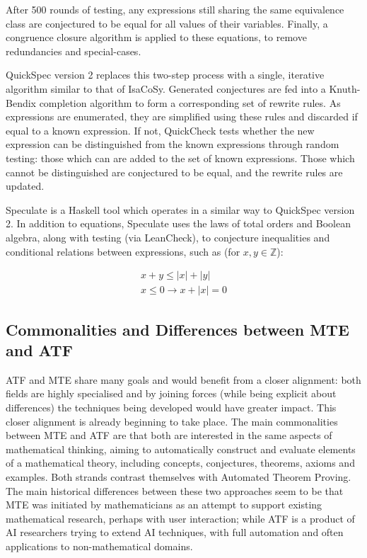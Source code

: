 After 500 rounds of testing, any expressions still sharing the same equivalence
class are conjectured to be equal for all values of their variables. Finally, a
congruence closure algorithm is applied to these equations, to remove
redundancies and special-cases.

QuickSpec version 2 replaces this two-step process with a single, iterative
algorithm similar to that of IsaCoSy. Generated conjectures are fed into a
Knuth-Bendix completion algorithm to form a corresponding set of rewrite rules.
As expressions are enumerated, they are simplified using these rules and
discarded if equal to a known expression. If not, QuickCheck tests whether the
new expression can be distinguished from the known expressions through random
testing: those which can are added to the set of known expressions. Those which
cannot be distinguished are conjectured to be equal, and the rewrite rules are
updated.

Speculate is a Haskell tool which operates in a similar way to QuickSpec
version 2. In addition to equations, Speculate uses the laws of total orders and
Boolean algebra, along with testing (via LeanCheck), to conjecture inequalities
and conditional relations between expressions, such as (for
$x, y \in \mathbb{Z}$):

\begin{equation*}
  \begin{aligned}
    x + y \leq \lvert x \rvert + \lvert y \rvert \\
    x \leq 0 \rightarrow x + \lvert x \rvert = 0
  \end{aligned}
\end{equation*}

\subsection{Commonalities and Differences between MTE and ATF}

ATF and MTE share many goals and would benefit from a
closer alignment: both fields are highly specialised and by joining
forces (while being explicit about differences) the techniques being
developed would have greater impact. This closer alignment is already
beginning to take place. The main commonalities between MTE and ATF
are that both are interested in the same aspects of mathematical
thinking, aiming to automatically construct and evaluate elements of a
mathematical theory, including concepts, conjectures, theorems, axioms
and examples. Both strands contrast themselves with Automated Theorem
Proving. The main historical differences between these two approaches seem to be
that MTE was initiated by mathematicians as an attempt to support existing
mathematical research, perhaps with user interaction; while ATF is a product of
AI researchers trying to extend AI techniques, with full automation and often
applications to non-mathematical domains.

